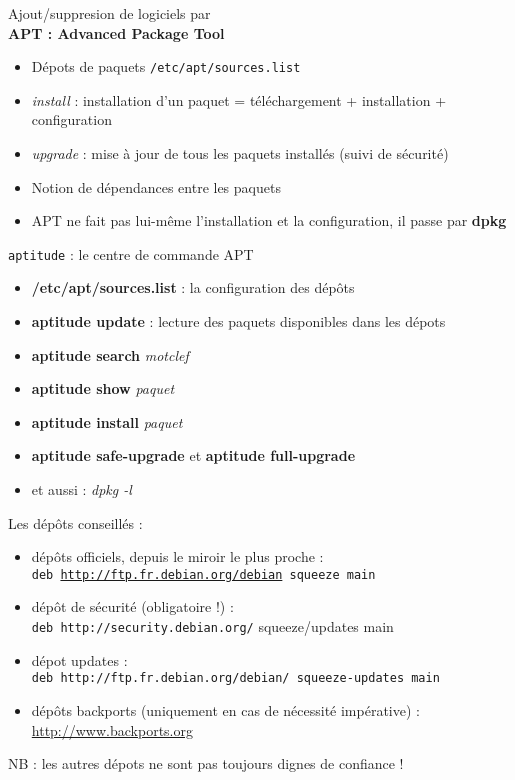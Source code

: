 \documentclass[french]{beamer}
\begin{document}
\begin{frame}
	\begin{center}
	Ajout/suppresion de logiciels par\\
	\textbf{APT : Advanced Package Tool}
	\end{center}
	\begin{itemize}
	\item Dépots de paquets \texttt{/etc/apt/sources.list}
	\item \textit{install} : installation d'un paquet = téléchargement + installation + configuration 
	\item \textit{upgrade} : mise à jour de tous les paquets installés (suivi de sécurité)
	\item Notion de dépendances entre les paquets
	\item APT ne fait pas lui-même l'installation et la configuration, il passe par \textbf{dpkg}
	\end{itemize}
\end{frame}

\begin{frame}
	\begin{center}
	\texttt{aptitude} : le centre de commande APT
	\end{center}
	\begin{itemize}
	\item \textbf{/etc/apt/sources.list} : la configuration des dépôts
	\item \textbf{aptitude update} : lecture des paquets disponibles dans les dépots 
	\item \textbf{aptitude search} \textit{motclef}
	\item \textbf{aptitude show} \textit{paquet}
	\item \textbf{aptitude install} \textit{paquet}
	\item \textbf{aptitude safe-upgrade} et  \textbf{aptitude full-upgrade}
	\item et aussi : \textit{dpkg -l}
	\end{itemize}
\end{frame}

\begin{frame}
\begin{block}{ Les dépôts conseillés :}
	\begin{itemize}
	\item dépôts officiels, depuis le miroir le plus proche : \\
	 \texttt{deb \url{http://ftp.fr.debian.org/debian} squeeze main}
	\item dépôt de sécurité (obligatoire !) : \\
	 \texttt{deb http://security.debian.org/} squeeze/updates main
	\item dépot updates : \\
	\texttt{deb http://ftp.fr.debian.org/debian/ squeeze-updates main}
	\item dépôts backports (uniquement en cas de nécessité impérative) : \url{http://www.backports.org}
	\end{itemize}
\end{block}
NB : les autres dépots ne sont pas toujours dignes de confiance !
\end{frame}
\end{document}
